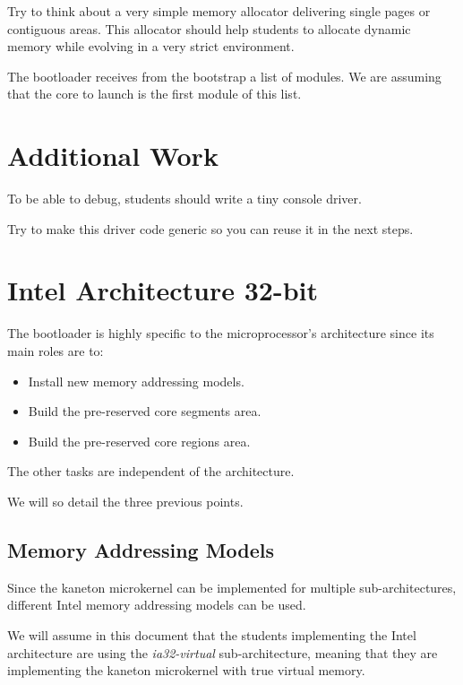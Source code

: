 Try to think about a very simple memory allocator delivering single
pages or contiguous areas. This allocator should help students to
allocate dynamic memory while evolving in a very strict environment.

The bootloader receives from the bootstrap a list of modules. We are
assuming that the core to launch is the first module of this list.

%
%

\section{Additional Work}

To be able to debug, students should write a tiny console driver.

Try to make this driver code generic so you can reuse it in the next steps.

%
%

\section{Intel Architecture 32-bit}

The bootloader is highly specific to the microprocessor's architecture
since its main roles are to:

\begin{itemize}
  \item
    Install new memory addressing models.
  \item
    Build the pre-reserved core segments area.
  \item
    Build the pre-reserved core regions area.
\end{itemize}

The other tasks are independent of the architecture.

We will so detail the three previous points.

%
%

\subsection{Memory Addressing Models}

Since the kaneton microkernel can be implemented for multiple
sub-architectures, different Intel memory addressing models can be used.

We will assume in this document that the students implementing the
Intel architecture are using the \textit{ia32-virtual} sub-architecture,
meaning that they are implementing the kaneton microkernel with true
virtual memory.

